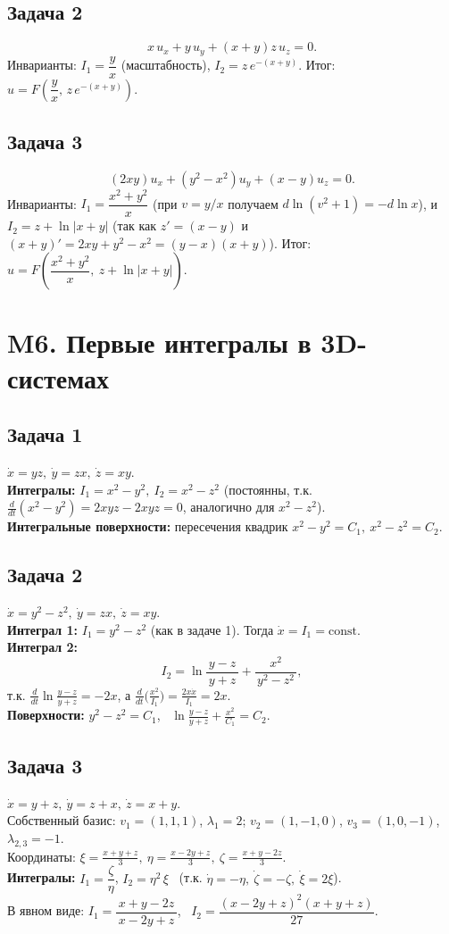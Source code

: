 \documentclass[12pt]{article}
\begin{document}
\subsection*{Задача 2}
\[
x\,u_x+y\,u_y+(x+y)z\,u_z=0.
\]
Инварианты: \(I_1=\dfrac{y}{x}\) (масштабность), \(I_2=z\,e^{-(x+y)}\).
Итог: \(u=F\!\left(\dfrac{y}{x},\,z\,e^{-(x+y)}\right)\).

\subsection*{Задача 3}
\[
(2xy)u_x+(y^2-x^2)u_y+(x-y)u_z=0.
\]
Инварианты: \(I_1=\dfrac{x^2+y^2}{x}\) (при $v=y/x$ получаем $d\ln(v^2+1)=-d\ln x$),
и \(I_2=z+\ln|x+y|\) (так как $z'=(x-y)$ и $(x+y)'=2xy+y^2-x^2=(y-x)(x+y)$).
Итог: \(u=F\!\left(\dfrac{x^2+y^2}{x},\ z+\ln|x+y|\right)\).

\section*{M6. Первые интегралы в 3D-системах}

\subsection*{Задача 1}
$\dot x=yz,\ \dot y=zx,\ \dot z=xy$. \\
\textbf{Интегралы: } $I_1=x^2-y^2,\ I_2=x^2-z^2$ (постоянны, т.к. $\frac{d}{dt}(x^2-y^2)=2xyz-2xyz=0$, аналогично для $x^2-z^2$). \\
\textbf{Интегральные поверхности: } пересечения квадрик $x^2-y^2=C_1,\ x^2-z^2=C_2$.

\subsection*{Задача 2}
$\dot x=y^2-z^2,\ \dot y=zx,\ \dot z=xy$. \\
\textbf{Интеграл 1: } $I_1=y^2-z^2$ (как в задаче 1). Тогда $\dot x=I_1=\text{const}$. \\
\textbf{Интеграл 2: } 
\[
I_2=\ln\!\frac{y-z}{\,y+z\,}+\frac{x^2}{\,y^2-z^2\,},
\]
т.к. $\frac{d}{dt}\ln\frac{y-z}{y+z}=-2x$, а $\frac{d}{dt}\!\bigl(\frac{x^2}{I_1}\bigr)=\frac{2x\dot x}{I_1}=2x$. \\
\textbf{Поверхности: } $y^2-z^2=C_1$, \ $\ln\frac{y-z}{y+z}+\frac{x^2}{C_1}=C_2$.

\subsection*{Задача 3}
$\dot x=y+z,\ \dot y=z+x,\ \dot z=x+y$. \\
Собственный базис: $v_1=(1,1,1)$, $\lambda_1=2$; $v_2=(1,-1,0)$, $v_3=(1,0,-1)$, $\lambda_{2,3}=-1$. \\
Координаты: $\xi=\frac{x+y+z}{3},\ \eta=\frac{x-2y+z}{3},\ \zeta=\frac{x+y-2z}{3}$. \\
\textbf{Интегралы: } $I_1=\dfrac{\zeta}{\eta}$, \quad $I_2=\eta^2\,\xi$ \ (т.к. $\dot\eta=-\eta,\ \dot\zeta=-\zeta,\ \dot\xi=2\xi$). \\
В явном виде: $I_1=\dfrac{x+y-2z}{\,x-2y+z\,}$, \ $I_2=\dfrac{(x-2y+z)^2(x+y+z)}{27}$.
\end{document}
